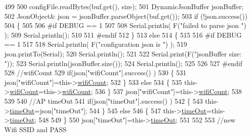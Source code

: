 \begin{DoxyCode}
499 
500         configFile.readBytes(buf.get(), size);
501         DynamicJsonBuffer jsonBuffer;
502         JsonObject& json = jsonBuffer.parseObject(buf.get());
503         \textcolor{keywordflow}{if} (!json.success()) 
504         \{
505         
506 \textcolor{preprocessor}{        #if DEBUG == 1 }
507 
508             Serial.println( F(\textcolor{stringliteral}{"failed to parse json "}) );
509             Serial.println();
510         
511 \textcolor{preprocessor}{        #endif}
512         \} 
513         \textcolor{keywordflow}{else}
514         \{
515         
516 \textcolor{preprocessor}{        #if DEBUG == 1 }
517         
518             Serial.println( F(\textcolor{stringliteral}{"configuration json is "}) );
519             json.printTo(Serial);
520             Serial.println();
521 
522             Serial.print(F(\textcolor{stringliteral}{"jsonBuffer size: "}));
523             Serial.println(jsonBuffer.size());
524             Serial.println();
525 
526 
527 \textcolor{preprocessor}{        #endif}
528             \textcolor{comment}{//wifiCount}
529             \textcolor{keywordflow}{if}(json[\textcolor{stringliteral}{"wifiCount"}].success() )
530             \{           
531                 json[\textcolor{stringliteral}{"wifiCount"}]=this->\hyperlink{classCoolWifi_ab133bd92fcb895b884deecd6678592e4}{wifiCount};
532             \}
533             \textcolor{keywordflow}{else}
534             \{
535                 this->\hyperlink{classCoolWifi_ab133bd92fcb895b884deecd6678592e4}{wifiCount}=this->\hyperlink{classCoolWifi_ab133bd92fcb895b884deecd6678592e4}{wifiCount};
536             \}
537             json[\textcolor{stringliteral}{"wifiCount"}]=this->\hyperlink{classCoolWifi_ab133bd92fcb895b884deecd6678592e4}{wifiCount};
538 
539             
540             \textcolor{comment}{//AP timeOut}
541             \textcolor{keywordflow}{if}(json[\textcolor{stringliteral}{"timeOut"}].success() )
542             \{
543                 this->\hyperlink{classCoolWifi_a952111605f25156588b5632caaba1c6f}{timeOut}=json[\textcolor{stringliteral}{"timeOut"}];
544             \}
545             \textcolor{keywordflow}{else}
546             \{
547                 this->\hyperlink{classCoolWifi_a952111605f25156588b5632caaba1c6f}{timeOut}=this->\hyperlink{classCoolWifi_a952111605f25156588b5632caaba1c6f}{timeOut};
548 
549             \}
550             json[\textcolor{stringliteral}{"timeOut"}]=this->\hyperlink{classCoolWifi_a952111605f25156588b5632caaba1c6f}{timeOut};
551             
552             
553             \textcolor{comment}{//new Wifi SSID and PASS}

\end{DoxyCode}
